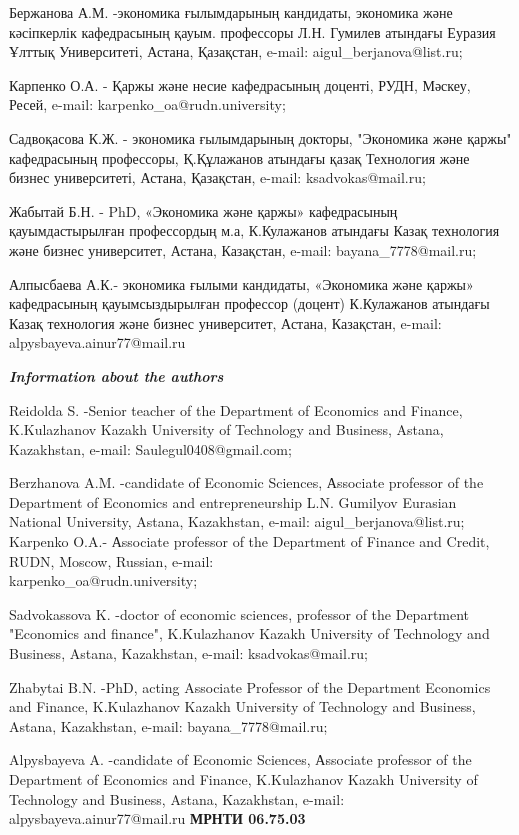 Бержанова А.М. -экономика ғылымдарының кандидаты, экономика және
кәсіпкерлік кафедрасының қауым. профессоры Л.Н. Гумилев атындағы Еуразия
Ұлттық Университеті, Астана, Қазақстан, e-mail:
aigul\_berjanova@list.ru;

Карпенко О.А. - Қаржы және несие кафедрасының доценті, РУДН, Мәскеу,
Ресей, e-mail: karpenko\_oa@rudn.university;

Садвоқасова К.Ж. - экономика ғылымдарының докторы, "Экономика және
қаржы" кафедрасының профессоры, Қ.Құлажанов атындағы қазақ Технология
және бизнес университеті, Астана, Қазақстан, e-mail: ksadvokas@mail.ru;

Жабытай Б.Н. - PhD, «Экономика және қаржы» кафедрасының қауымдастырылған
профессордың м.а, К.Кулажанов атындағы Казақ технология және бизнес
университет, Астана, Казақстан, e-mail: bayana\_7778@mail.ru;

Алпысбаева А.К.- экономика ғылыми кандидаты, «Экономика және қаржы»
кафедрасының қауымсыздырылған профессор (доцент) К.Кулажанов атындағы
Казақ технология және бизнес университет, Астана, Казақстан, e-mail:
alpysbayeva.ainur77@mail.ru

\emph{{\bfseries Information about the authors}}

Reidolda S. -Senior teacher of the Department of Economics and Finance,
K.Kulazhanov Kazakh University of Technology and Business, Astana,
Kazakhstan, e-mail: Saulegul0408@gmail.com;

Berzhanova A.M. -candidate of Economic Sciences, Аssociate professor of
the Department of Economics and entrepreneurship L.N. Gumilyov Eurasian
National University, Astana, Kazakhstan, e-mail:
aigul\_berjanova@list.ru; Karpenko O.A.- Аssociate professor of the
Department of Finance and Credit, RUDN, Moscow, Russian, e-mail:\\
karpenko\_oa@rudn.university;

Sadvokassova K. -doctor of economic sciences, professor of the
Department "Economics and finance", K.Kulazhanov Kazakh University of
Technology and Business, Astana, Kazakhstan, e-mail: ksadvokas@mail.ru;

Zhabytai B.N. -PhD, acting Associate Professor of the Department
Economics and Finance, K.Kulazhanov Kazakh University of Technology and
Business, Astana, Kazakhstan, e-mail: bayana\_7778@mail.ru;

Alpysbayeva A. -candidate of Economic Sciences, Аssociate professor of
the Department of Economics and Finance, K.Kulazhanov Kazakh University
of Technology and Business, Astana, Kazakhstan, e-mail:
alpysbayeva.ainur77@mail.ru\newpage
{\bfseries МРНТИ 06.75.03}

